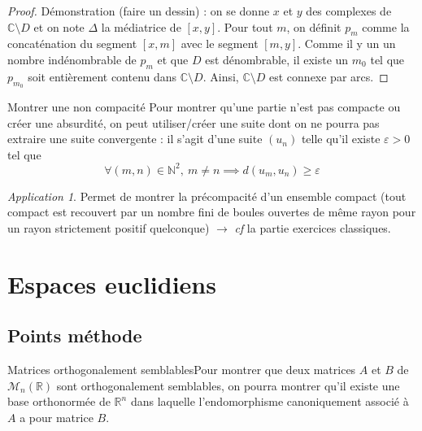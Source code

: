 \documentclass[french]{book}
\newcommand{\N}{\mathbb{N}}
\newcommand{\R}{\mathbb{R}}
\newcommand{\C}{\mathbb{C}}
\theoremstyle{plain}
\theoremstyle{definition}
\theoremstyle{remark}
\newtheorem*{app}{Application}
\begin{document}
\begin{proof}
	Démonstration (faire un dessin) : on se donne $x$ et $y$ des complexes de $\C\setminus D$ et on note $\Delta $ la médiatrice de $[x,y]$. Pour tout $m$, on définit $p_m$ comme la concaténation du segment $[x,m]$ avec le segment $[m,y]$. Comme il y un un nombre indénombrable de $p_m$ et que $D$ est dénombrable, il existe un $m_0$ tel que $p_{m_0}$ soit entièrement contenu dans $\C\setminus D$. Ainsi, $\C\setminus D$ est connexe par arcs.
\end{proof}
\begin{AS}{Montrer une non compacité} Pour montrer qu’une partie n’est pas compacte ou créer une absurdité, on peut utiliser/créer une suite dont on ne pourra pas extraire une suite convergente : il s’agit d’une suite $(u_n)$ telle qu’il existe $\varepsilon>0$ tel que $$\forall (m,n)\in\N^2,\ m\ne n\implies d(u_m,u_n)\geqslant \varepsilon$$
\end{AS}
\begin{app}
	Permet de montrer la précompacité d'un ensemble compact (tout compact est recouvert par un nombre fini de boules ouvertes de même rayon pour un rayon strictement positif quelconque) $\to$ \textit{cf} la partie exercices classiques.
\end{app}


\chapter{Espaces euclidiens}
\localtableofcontents
\section{Points méthode}
\begin{PM}{Matrices orthogonalement semblables}Pour montrer que deux matrices $A$ et $B$ de $\mathcal{M}_n(\R)$ sont orthogonalement semblables, on pourra montrer qu'il existe une base orthonormée de $\R^n$ dans laquelle l'endomorphisme canoniquement associé à $A$ a pour matrice $B$.
\end{PM}
\end{document}
